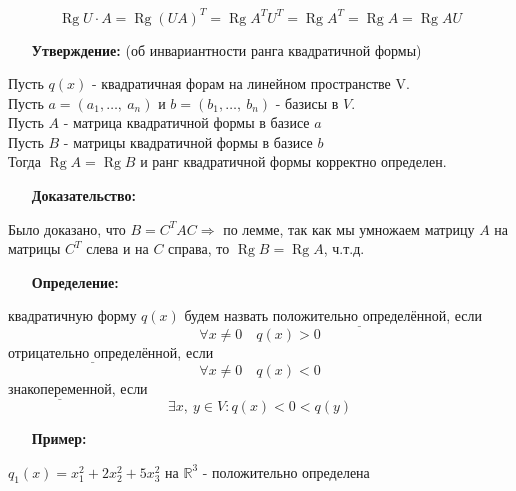 \documentclass[12pt, letterpaper, twoside]{article}
\begin{document}
    \[\operatorname{Rg} U\cdot A = \operatorname{Rg} (UA)^T = \operatorname{Rg} A^T U^T = \operatorname{Rg} A^T = \operatorname{Rg} A = \operatorname{Rg} A U\]
    \begin{enumerate}
        \item[\textbf{Утверждение:}] (об инвариантности ранга квадратичной формы)
    \end{enumerate}
    Пусть $q(x)$ - квадратичная форам на линейном пространстве V.\\
    Пусть $a = (a_1,\dots,\ a_n)$ и $b = (b_1,\dots,\ b_n)$ - базисы в $V$.\\
    Пусть $A$ - матрица квадратичной формы в базисе $a$\\
    Пусть $B$ - матрицы квадратичной формы в базисе $b$\\
    Тогда $\operatorname{Rg} A = \operatorname{Rg} B$ и ранг квадратичной формы корректно определен.
    \begin{enumerate}
        \item[\textbf{Доказательство:}]
    \end{enumerate}
    Было доказано, что $B = C^T AC\Rightarrow$ по лемме, так как мы умножаем матрицу $A$ на матрицы $C^T$ слева и на $C$ справа, то $\operatorname{Rg} B = \operatorname{Rg} A$, ч.т.д.
    \begin{enumerate}
        \item[\textbf{Определение:}]
    \end{enumerate}
    квадратичную форму $q(x)$ будем назвать $\underline{\text{положительно определённой}}$, если \[\forall x \neq 0\quad q(x) > 0\]
    $\underline{\text{отрицательно определённой}}$, если \[\forall x\neq 0\quad q(x) < 0\]
    $\underline{\text{знакопеременной}}$, если \[\exists x,\ y\in V: q(x) < 0 < q(y)\] 
    \begin{enumerate}
        \item[\textbf{Пример:}]
    \end{enumerate}
    $q_1(x) = x_1^2 + 2x^2_2 + 5x_3^2$ на $\mathbb{R}^3$ - положительно определена\\
    
\end{document}
